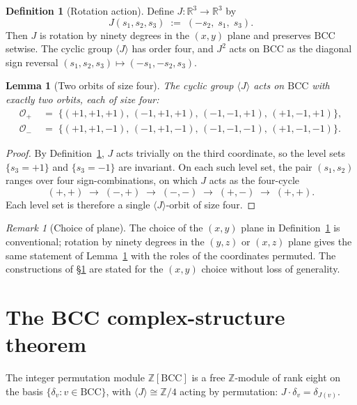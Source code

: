 \documentclass[11pt,reqno]{amsart}
\theoremstyle{plain}
\newtheorem{lemma}[theorem]{Lemma}
\theoremstyle{definition}
\newtheorem{definition}[theorem]{Definition}
\theoremstyle{remark}
\newtheorem{remark}[theorem]{Remark}
\numberwithin{equation}{section}
\newcommand{\BCC}{\mathrm{BCC}}
\begin{document}
\begin{definition}[Rotation action]
\label{def:J}
Define $J \colon \mathbb{R}^{3} \to \mathbb{R}^{3}$ by
\[
  J(s_1, s_2, s_3) \;:=\; (-s_2,\; s_1,\; s_3).
\]
Then $J$ is rotation by ninety degrees in the $(x, y)$ plane and
preserves $\BCC$ setwise. The cyclic group $\langle J \rangle$ has
order four, and $J^{2}$ acts on $\BCC$ as the diagonal sign reversal
$(s_1, s_2, s_3) \mapsto (-s_1, -s_2, s_3)$.
\end{definition}

\begin{lemma}[Two orbits of size four]
\label{lem:orbits}
The cyclic group $\langle J \rangle$ acts on $\BCC$ with exactly two
orbits, each of size four:
\begin{align*}
  \mathcal{O}_{+} \;&=\; \{(+1,+1,+1),\, (-1,+1,+1),\, (-1,-1,+1),\, (+1,-1,+1)\}, \\
  \mathcal{O}_{-} \;&=\; \{(+1,+1,-1),\, (-1,+1,-1),\, (-1,-1,-1),\, (+1,-1,-1)\}.
\end{align*}
\end{lemma}

\begin{proof}
By Definition~\ref{def:J}, $J$ acts trivially on the third
coordinate, so the level sets $\{s_{3} = +1\}$ and $\{s_{3} = -1\}$
are invariant. On each such level set, the pair $(s_1, s_2)$ ranges
over four sign-combinations, on which $J$ acts as the four-cycle
\[
  (+,+) \;\to\; (-,+) \;\to\; (-,-) \;\to\; (+,-) \;\to\; (+,+).
\]
Each level set is therefore a single $\langle J \rangle$-orbit of
size four.
\end{proof}

\begin{remark}[Choice of plane]
The choice of the $(x, y)$ plane in Definition~\ref{def:J} is
conventional; rotation by ninety degrees in the $(y, z)$ or $(x, z)$
plane gives the same statement of Lemma~\ref{lem:orbits} with the
roles of the coordinates permuted. The constructions of
\S\ref{sec:complex-structure} are stated for the $(x, y)$ choice
without loss of generality.
\end{remark}

\section{The BCC complex-structure theorem}
\label{sec:complex-structure}

The integer permutation module $\mathbb{Z}[\BCC]$ is a free
$\mathbb{Z}$-module of rank eight on the basis $\{\delta_{v} : v \in
\BCC\}$, with $\langle J \rangle \cong \mathbb{Z}/4$ acting by
permutation: $J \cdot \delta_{v} = \delta_{J(v)}$.
\end{document}
